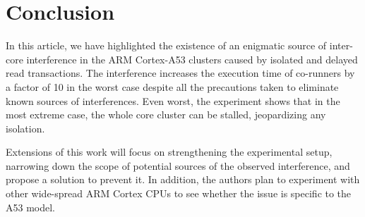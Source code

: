 \section{Conclusion}
%

    In this article, we have highlighted the existence of an enigmatic source of inter-core interference in the ARM Cortex-A53 clusters caused by isolated and delayed read transactions.
    The interference increases the execution time of co-runners by a factor of 10 in the worst case despite all the precautions taken to eliminate known sources of interferences.
    Even worst, the experiment shows that in the most extreme case, the whole core cluster can be stalled, jeopardizing any isolation.

    Extensions of this work will focus on strengthening the experimental setup, narrowing down the scope of potential sources of the observed interference, and propose a solution to prevent it. In addition, the authors plan to experiment with other wide-spread ARM Cortex CPUs to see whether the issue is specific to the A53 model.
